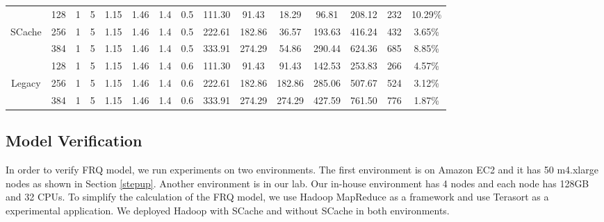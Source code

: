 {\begin{table}[!t]
\begin{tabular}{|c||c|c|c|c|c|c|c||c|c|c|c|c|c|c|}
\hline
& 128	& 1 & 5 &	1.15 &	1.46	&	1.4 &	0.5 &	111.30 &	91.43	&	18.29	&	96.81	&	208.12	&	232	&	10.29\%	\\
SCache
& 256	& 1 & 5 &	1.15 &	1.46	&	1.4 &	0.5 &	222.61 &	182.86	&	36.57	&	193.63	&	416.24	&	432	&	3.65\%	\\
& 384	& 1 & 5 &	1.15 &	1.46	&	1.4 &	0.5 &	333.91 &	274.29	&	54.86	&	290.44	&	624.36	&	685 &	8.85\%	\\
\hline
& 128	& 1 & 5 &	1.15 &	1.46	&	1.4 &	0.6 &	111.30 &	91.43	&	91.43	&	142.53	&	253.83	&	266 &	4.57\%	\\
Legacy
& 256	& 1 & 5 &	1.15 &	1.46	&	1.4 &	0.6 &	222.61 &	182.86	&	182.86	&	285.06	&	507.67	&	524 &	3.12\%	\\
& 384	& 1 & 5 &	1.15 &	1.46	&	1.4 &	0.6 &	333.91 &	274.29	&	274.29	&	427.59	&	761.50	&	776 &	1.87\%	\\

\hline
\end{tabular}
\end{table}

\subsection{Model Verification}\label{model_verification}
In order to verify FRQ model, we run experiments on two environments. The first environment is on Amazon EC2 and it has 50 m4.xlarge nodes as shown in Section \ref{stepup}. Another environment is in our lab. Our in-house environment has 4 nodes and each node has 128GB and 32 CPUs. To simplify the calculation of the FRQ model, we use Hadoop MapReduce as a framework and use Terasort as a experimental application. We deployed Hadoop with SCache and without SCache in both environments.

}
